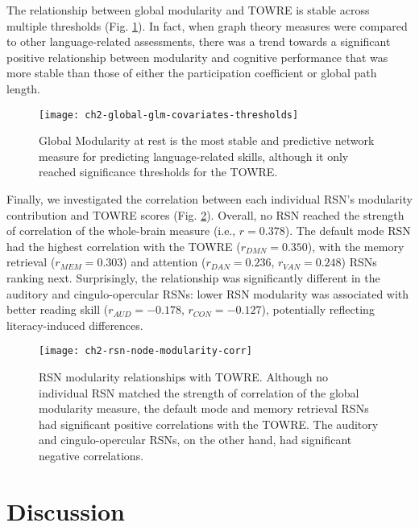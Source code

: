 The relationship between global modularity and TOWRE is stable across multiple thresholds (Fig. \ref{fig:ch2-global-glm-covariates-thresh}). In fact, when graph theory measures were compared to other language-related assessments, there was a trend towards a significant positive relationship between modularity and cognitive performance that was more stable than those of either the participation coefficient or global path length. 

\begin{figure}[t]
    \centering
    \texttt{[image: ch2-global-glm-covariates-thresholds]}
    \caption[Global modularity at rest is the best predictor of cognitive skills.] {Global Modularity at rest is the most stable and predictive network measure for predicting language-related skills, although it only reached significance thresholds for the TOWRE.}
    \label{fig:ch2-global-glm-covariates-thresh}
\end{figure}

Finally, we investigated the correlation between each individual RSN's modularity contribution and TOWRE scores (Fig. \ref{fig:ch2-rsn-node-modularity-corr}). Overall, no RSN reached the strength of correlation of the whole-brain measure (i.e., $r = 0.378$). The default mode RSN had the highest correlation with the TOWRE ($r_{DMN} = 0.350$), with the memory retrieval ($r_{MEM} = 0.303$) and attention ($r_{DAN} = 0.236$, $r_{VAN} = 0.248$) RSNs ranking next. Surprisingly, the relationship was significantly different in the auditory and cingulo-opercular RSNs: lower RSN modularity was associated with better reading skill ($r_{AUD} = -0.178$, $r_{CON} = -0.127$), potentially reflecting literacy-induced differences.

\begin{figure}[t]
    \centering
    \texttt{[image: ch2-rsn-node-modularity-corr]}
    \caption[RSN modularity relationships with reading skill] {RSN modularity relationships with TOWRE. Although no individual RSN matched the strength of correlation of the global modularity measure, the default mode and memory retrieval RSNs had significant positive correlations with the TOWRE. The auditory and cingulo-opercular RSNs, on the other hand, had significant negative correlations.}
    \label{fig:ch2-rsn-node-modularity-corr}
\end{figure}

\section{Discussion}

